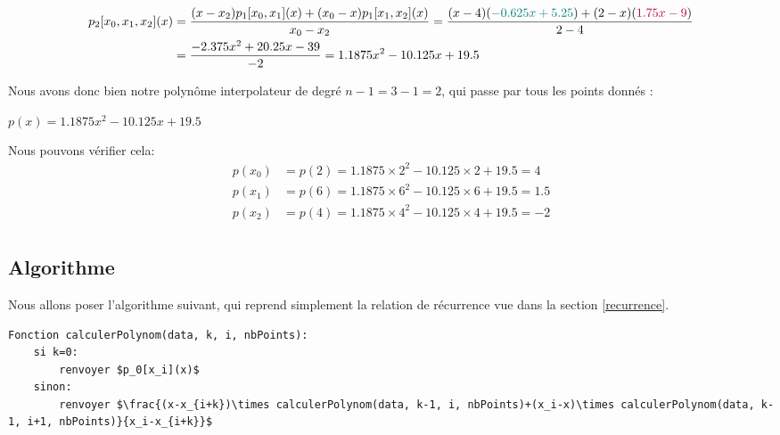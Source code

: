 \documentclass{report}
\begin{document}
\begin{center}
    \begin{align*}
        p_2[x_0, x_1, x_2](x)&=\frac{(x-x_2)p_1[x_0, x_1](x)+(x_0-x)p_1[x_1, x_2](x)}{x_0-x_2}=\frac{(x-4)(\textcolor{teal}{-0.625x+5.25})+(2-x)(\textcolor{purple}{1.75x-9})}{2-4}\vspace{4pt}\\&=\frac{-2.375x^2+20.25x-39}{-2}=1.1875x^2-10.125x+19.5\vspace{4pt}\\
    \end{align*}
\end{center}
Nous avons donc bien notre polynôme interpolateur de degré $n-1=3-1=2$, qui passe par tous les points donnés :\\
\begin{center}
    $p(x)=1.1875x^2-10.125x+19.5$\\
\end{center}
Nous pouvons vérifier cela:
\begin{align*}
    p(x_0)&=p(2)=1.1875\times 2^2-10.125\times 2+19.5=4\\
    p(x_1)&=p(6)=1.1875\times 6^2-10.125\times 6+19.5=1.5\\
    p(x_2)&=p(4)=1.1875\times 4^2-10.125\times 4+19.5=-2\\
\end{align*}
\subsection{Algorithme}
Nous allons poser l'algorithme suivant, qui reprend simplement la relation de récurrence vue dans la section \ref{recurrence}.
\begin{lstlisting}[mathescape=true, frame=single, basicstyle=\linespread{1.5}\fontsize{8}{10}\selectfont]
Fonction calculerPolynom(data, k, i, nbPoints):
    si k=0:
        renvoyer $p_0[x_i](x)$
    sinon:
        renvoyer $\frac{(x-x_{i+k})\times calculerPolynom(data, k-1, i, nbPoints)+(x_i-x)\times calculerPolynom(data, k-1, i+1, nbPoints)}{x_i-x_{i+k}}$
\end{lstlisting}
\end{document}
